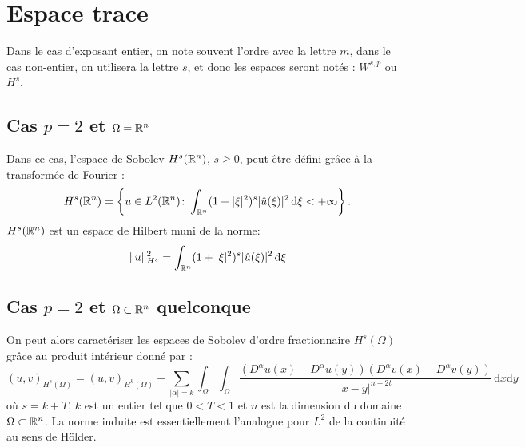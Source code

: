 \medskip
\section{Espace trace}


\medskip
Dans le cas d'exposant entier, on note souvent l'ordre avec la lettre $m$,
dans le cas non-entier, on utilisera la lettre $s$, et donc les espaces seront notés : $W^{s,p}$ ou $H^s$.

\medskip
\subsection{Cas $p=2$ et $\Omega=\mathbb R^{n}$}

Dans ce cas, l'espace de Sobolev $H^{s}(\mathbb R^n)$, $s\geqslant 0$, peut être défini grâce
à la transformée de Fourier :
\begin{equation}
H^{s} (\mathbb R^n) = \left\{ u \in L^{2}(\mathbb R^n) \colon \int_{\mathbb R^n} ( 1 + | \xi |^{2 } )^{s} | \hat{u} (\xi) |^{2} \, \mathrm{d} \xi < + \infty \right\}.
\end{equation}
$H^{s}(\mathbb R^n)$ est un espace de Hilbert muni de la norme:
\begin{equation}\| u \|_{H^{s}}^{2} = \int_{\mathbb R^n} ( 1 + | \xi |^{2 } )^{s} | \hat{u} (\xi) |^{2} \, \mathrm{d} \xi \end{equation}

\medskip
\subsection{Cas $p=2$ et $\Omega \subset \mathbb R^{n}$ quelconque}
On peut alors caractériser les espaces de Sobolev d'ordre fractionnaire $H^s(\Omega)$
grâce au produit intérieur donné par :
\begin{equation}
(u, v)_{H^{s} (\Omega)} = (u,v)_{H^{k} (\Omega)} + \sum_{| \alpha | = k} \int_{\Omega } \int_{\Omega } \frac{( D^{\alpha }u (x) - D^{\alpha }u (y) ) (D^{\alpha }v (x) - D^{\alpha }v (y) )}{| x - y |^{n + 2 t}} \, \mathrm{d} x \mathrm{d} y
\end{equation}
où $s = k + T$, $k$ est un entier tel que $0 < T < 1$ et $n$ est la dimension du domaine
$\Omega \subset \mathbb R^{n}$.
La norme induite est essentiellement l'analogue pour $L^2$ de la continuité au sens de H\"older.

